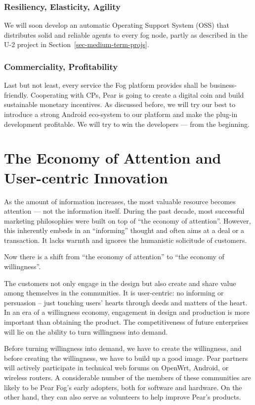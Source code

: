 \subsubsection{Resiliency, Elasticity, Agility}
We will soon develop an automatic Operating Support System (OSS) that distributes solid and reliable agents to every fog node, partly as described in the U-2 project in Section~\ref{sec-medium-term-projs}. 

\subsubsection{Commerciality, Profitability}
Last but not least, every service the Fog platform provides shall be business-friendly. Cooperating with CPs, Pear is going to create a digital coin and build sustainable monetary incentives. 
As discussed before, we will try our best to introduce a strong Android eco-system to our platform and make the plug-in development profitable. We will try to win the developers --- from the beginning.

\section{The Economy of Attention and User-centric Innovation}
As the amount of information increases, the most valuable resource becomes attention --- not the information itself. During the past decade, most successful marketing philosophies were built on top of ``the economy of attention''. However, this inherently embeds in an ``informing'' thought and often aims at a deal or a transaction. It lacks warmth and ignores the humanistic solicitude of customers. 

Now there is a shift from ``the economy of attention'' to ``the economy of willingness''. 

The customers not only engage in the design but also create and share value among themselves in the communities. It is user-centric: no informing or persuasion -- just touching users' hearts through deeds and matters of the heart. In an era of a willingness economy, engagement in design and production is more important than obtaining the product. The competitiveness of future enterprises will lie on the ability to turn willingness into demand. 

Before turning willingness into demand, we have to create the willingness, and before creating the willingness, we have to build up a good image. Pear partners will actively participate in technical web forums on OpenWrt, Android, or wireless routers. A considerable number of the members of these communities are likely to be Pear Fog's early adopters, both for software and hardware. 
On the other hand, they can also serve as volunteers to help improve Pear's products. 

